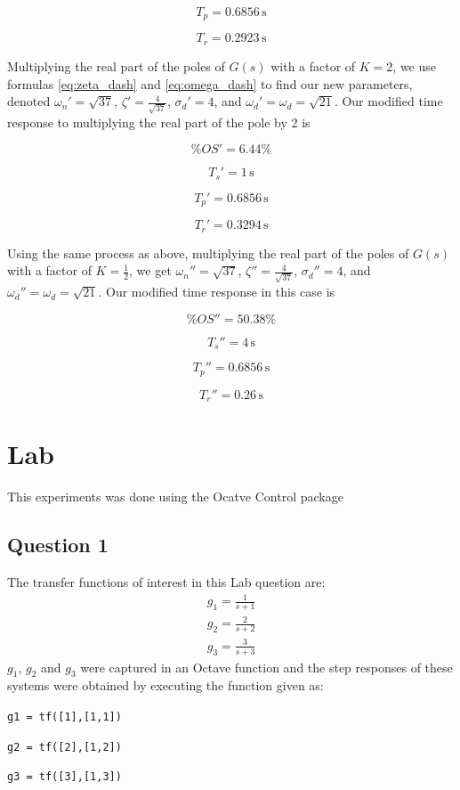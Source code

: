 \documentclass[a4paper, 12pt]{article}
\begin{document}
			\[
				T_p = 0.6856\,\text{s}
			\]

			\[
				T_r = 0.2923\,\text{s}
			\]

			Multiplying the real part of the poles of $G(s)$ with a factor of $K=2$, we use formulas \eqref{eq:zeta_dash} and \eqref{eq:omega_dash} to find our new parameters, denoted $\omega_n' = \sqrt{37}$, $\zeta' = \frac{4}{\sqrt{37}}$, $\sigma_d' = 4$, and $\omega_d' = \omega_d = \sqrt{21}$. Our modified time response to multiplying the real part of the pole by 2 is

			\[
				\%OS' = 6.44\%
			\]

			\[
				T_s' = 1\,\text{s}
			\]

			\[
				T_p' = 0.6856\,\text{s}
			\]

			\[
				T_r' = 0.3294\,\text{s}
			\]

			Using the same process as above, multiplying the real part of the poles of $G(s)$ with a factor of $K=\frac{1}{2}$, we get $\omega_n'' = \sqrt{37}$, $\zeta'' = \frac{4}{\sqrt{37}}$, $\sigma_d'' = 4$, and $\omega_d'' = \omega_d = \sqrt{21}$. Our modified time response in this case is

			\[
				\%OS'' = 50.38\%
			\]

			\[
				T_s'' = 4\,\text{s}
			\]

			\[
				T_p'' = 0.6856\,\text{s}
			\]

			\[
				T_r'' = 0.26\,\text{s}
			\]


	\section{Lab} %
	\label{sec:lab}
		This experiments was done using the Ocatve Control package
	\subsection{Question 1}
	\label{sec:question_1_lab}
		The transfer functions of interest in this Lab question are:
			\begin{equation*}
				\begin{array}{rcl}
					g_1 = \frac{1}{s+1}\\
					g_2 = \frac{2}{s+2}\\
					g_3 = \frac{3}{s+3}
				\end{array}
			\end{equation*}
		$g_1$, $g_2$ and $g_3$ were captured in an Octave function and the step responses of these systems were obtained by executing the function given as:\par
		\texttt{g1 = tf([1],[1,1])}\par
		\texttt{g2 = tf([2],[1,2])}\par
		\texttt{g3 = tf([3],[1,3])}\par
\end{document}

